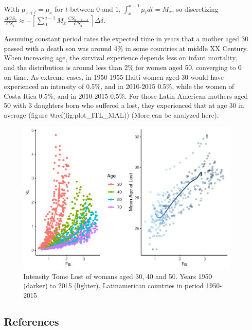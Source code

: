 \documentclass[
]{article}
\begin{document}
With \(\mu_{x+t}=\mu_x\) for \(t\) between 0 and 1,
\(\int_{x}^{x+1}{\mu_t dt} = M_x\), so discretizing
\(\frac{\Delta CS_{a}}{CS_a} \approx - \left[\sum_{0}^{a-1}{M_x \, \frac{CS_{a-1-x}}{CS_a}\,}\right] \Delta \delta\).

Assuming constant period rates the expected time in years that a mother
aged 30 passed with a death son was around 4\% in some countries at
middle XX Century. When increasing age, the survival experience depends
less on infant mortality, and the distribution is around less than 2\%
for women aged 50, converging to 0 on time. As extreme cases, in
1950-1955 Haiti women aged 30 would have experienced an intensity of
0.5\%, and in 2010-2015 0.5\%, while the women of Costa Rica 0.5\%, and
in 2010-2015 0.5\%. For those Latin American mothers aged 50 with 3
daughters born who suffered a lost, they experienced that at age 30 in
average (figure @ref(fig:plot\_ITL\_MAL)) (More can be analyzed here).

\begin{figure}
\centering
\includegraphics{paper_files/figure-latex/plot_ITL_MAL-1.pdf}
\caption{Intensity Tome Lost of womans aged 30, 40 and 50. Years 1950
(darker) to 2015 (lighter). Latinamerican countries in period 1950-2015}
\end{figure}

\hypertarget{references}{%
\subsection*{References}\label{references}}
\end{document}
